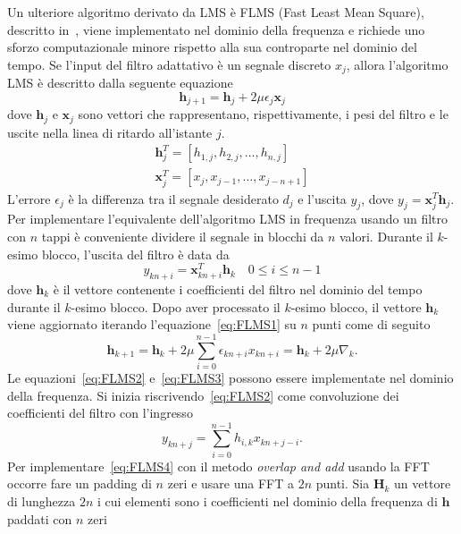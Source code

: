 \documentclass[12pt,a4paper,titlepage]{article}
\begin{document}
Un ulteriore algoritmo derivato da LMS è FLMS (Fast Least Mean Square), descritto in~\cite{Ferrara:FLMS}, viene implementato nel dominio della frequenza e richiede uno sforzo computazionale minore rispetto alla sua controparte nel dominio del tempo. Se l'input del filtro adattativo è un segnale discreto $x_j$, allora l'algoritmo LMS è descritto dalla seguente equazione
\begin{equation}\label{eq:FLMS1}
\mathbf{h}_{j+1} = \mathbf{h}_j + 2 \mu \epsilon_j \mathbf{x}_j
\end{equation}
dove $\mathbf{h}_j$ e $\mathbf{x}_j$ sono vettori che rappresentano, rispettivamente, i pesi del filtro e le uscite nella linea di ritardo all'istante $j$.
\begin{equation*}
\begin{split}
\mathbf{h}_j^T = [h_{1,j}, h_{2,j}, \dots, h_{n,j} ]\\
\mathbf{x}_j^T = [x_{j}, x_{j-1}, \dots, x_{j-n+1}]
\end{split} 
\end{equation*}
L'errore $\epsilon_j$ è la differenza tra il segnale desiderato $d_j$ e l'uscita $y_j$, dove $y_j = \mathbf{x}_j^T \mathbf{h}_j$. Per implementare l'equivalente dell'algoritmo LMS in frequenza usando un filtro con $n$ tappi è conveniente dividere il segnale in blocchi da $n$ valori. Durante il $k$-esimo blocco, l'uscita del filtro è data da 
\begin{equation}\label{eq:FLMS2}
y_{kn+i} = \mathbf{x}^T_{kn+i} \mathbf{h}_k	\quad 0 \leq i \leq n-1
\end{equation}
dove $\mathbf{h}_k$ è il vettore contenente i coefficienti del filtro nel dominio del tempo durante il $k$-esimo blocco. Dopo aver processato il $k$-esimo blocco, il vettore $\mathbf{h}_k$ viene aggiornato iterando l'equazione~\eqref{eq:FLMS1} su $n$ punti come di seguito
\begin{equation}\label{eq:FLMS3}
\mathbf{h}_{k+1} = \mathbf{h}_k + 2\mu\sum_{i=0}^{n-1}\epsilon_{kn+i}x_{kn+i} = \mathbf{h}_k + 2\mu\nabla_k.
\end{equation}
Le equazioni~\eqref{eq:FLMS2} e~\eqref{eq:FLMS3} possono essere implementate nel dominio della frequenza. Si inizia riscrivendo~\eqref{eq:FLMS2} come convoluzione dei coefficienti del filtro con l'ingresso
\begin{equation}\label{eq:FLMS4}
y_{kn+j} = \sum_{i=0}^{n-1} h_{i,k}x_{kn+j-i}.
\end{equation}
Per implementare~\eqref{eq:FLMS4} con il metodo \textit{overlap and add} usando la FFT occorre fare un padding di $n$ zeri e usare una FFT a $2n$ punti. Sia $\mathbf{H}_k$ un vettore di lunghezza $2n$ i cui elementi sono i coefficienti nel dominio della frequenza di $\mathbf{h}$ paddati con $n$ zeri
\end{document}
